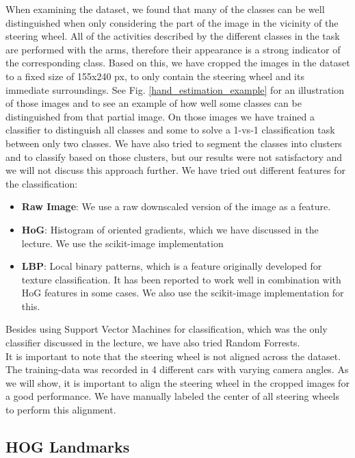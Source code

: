 \documentclass[10pt,twocolumn,letterpaper]{article}
\begin{document}
When examining the dataset, we found that many of the classes can be well distinguished when only considering the part of the image in the vicinity of the steering wheel. All of the activities described by the different classes in the task are performed with the arms, therefore their appearance is a strong indicator of the corresponding class. Based on this, we have cropped the images in the dataset to a fixed size of 155x240 px, to only contain the steering wheel and its immediate surroundings. See Fig. \ref{hand_estimation_example} for an illustration of those images and to see an example of how well some classes can be distinguished from that partial image. On those images we have trained a classifier to distinguish all classes and some to solve a 1-vs-1 classification task between only two classes. We have also tried to segment the classes into clusters and to classify based on those clusters, but our results were not satisfactory and we will not discuss this approach further. We have tried out different features for the classification:
\begin{itemize}
	\item \textbf{Raw Image}: We use a raw downscaled version of the image as a feature.
	\item \textbf{HoG}: Histogram of oriented gradients, which we have discussed in the lecture. We use the scikit-image implementation
	\item \textbf{LBP}: Local binary patterns, which is a feature originally developed for texture classification. It has been reported to work well in combination with HoG features in some cases. We also use the scikit-image implementation for this.
\end{itemize}
Besides using Support Vector Machines for classification, which was the only classifier discussed in the lecture, we have also tried Random Forrests.\\
It is important to note that the steering wheel is not aligned across the dataset. The training-data was recorded in 4 different cars with varying camera angles. As we will show, it is important to align the steering wheel in the cropped images for a good performance. We have manually labeled the center of all steering wheels to perform this alignment.



\subsection{HOG Landmarks}
\end{document}
